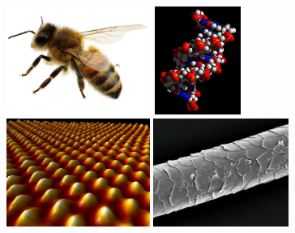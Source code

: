 \documentclass[12pt,a4paper]{article}
\begin{document}
\begin{figure}[h]
\includegraphics[height=100pt]{images/abeille.jpg}
\hfill
\includegraphics[height=100pt]{images/adn.jpg}
\hfill
\includegraphics[height=100pt]{images/atoms.jpg}
\hfill
\includegraphics[height=100pt]{images/hair.jpg}

\vspace{50pt}


\end{figure}
\end{document}

